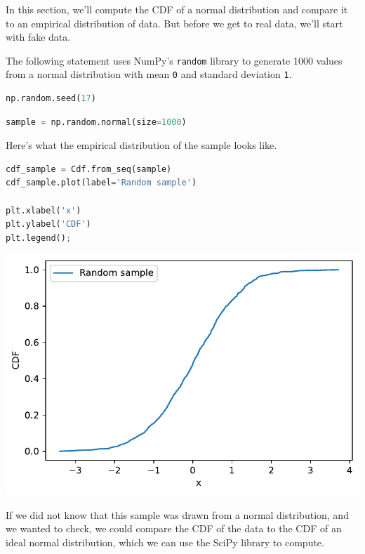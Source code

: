In this section, we'll compute the CDF of a normal distribution and
compare it to an empirical distribution of data. But before we get to
real data, we'll start with fake data.

The following statement uses NumPy's \passthrough{\lstinline!random!}
library to generate 1000 values from a normal distribution with mean
\passthrough{\lstinline!0!} and standard deviation
\passthrough{\lstinline!1!}.

\begin{lstlisting}[language=Python]
np.random.seed(17)
\end{lstlisting}

\begin{lstlisting}[language=Python]
sample = np.random.normal(size=1000)
\end{lstlisting}

Here's what the empirical distribution of the sample looks like.

\begin{lstlisting}[language=Python]
cdf_sample = Cdf.from_seq(sample)
cdf_sample.plot(label='Random sample')

plt.xlabel('x')
plt.ylabel('CDF')
plt.legend();
\end{lstlisting}

\begin{center}
\includegraphics[scale=0.75]{chapters/08_distributions_files/08_distributions_112_0.pdf}
\end{center}

If we did not know that this sample was drawn from a normal
distribution, and we wanted to check, we could compare the CDF of the
data to the CDF of an ideal normal distribution, which we can use the
SciPy library to compute.

